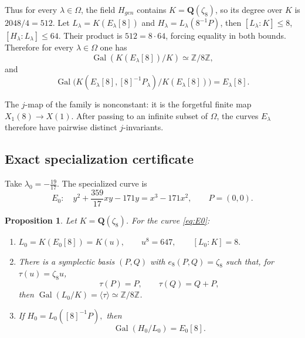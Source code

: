 \documentclass[11pt,a4paper]{amsart}
\newtheorem{proposition}[theorem]{Proposition}
\theoremstyle{definition}
\newcommand{\Q}{\mathbf Q}
\newcommand{\Gal}{\operatorname{Gal}}
\numberwithin{equation}{section}
\begin{document}
Thus  for every $\lambda\in\Omega$, the  field $H_{gen}$ contains $K=\Q(\zeta_8)$, so its degree over
$K$ is $2048/4=512$.  Let $L_\lambda=K(E_\lambda[8])$ and $H_\lambda=L_\lambda(8^{-1}P)$, then 
$
[L_\lambda:K]\le 8$,
$
[H_\lambda:L_\lambda]\le64.
$
Their product is $512=8\cdot64$, forcing equality in both bounds.  Therefore
for every $\lambda\in\Omega$ one has
\begin{equation*}\label{eq:full-specialized}
	\Gal(K(E_\lambda[8])/K)\simeq\mathbb{Z}/8\mathbb{Z},
\end{equation*}
and
\begin{equation*}\label{eq:full-translation}
	\Gal\bigl(K(E_\lambda[8],[8]^{-1}P_\lambda)/K(E_\lambda[8])\bigr)
	=E_\lambda[8].
\end{equation*}

The $j$-map of the family is nonconstant: it is the forgetful finite map
$X_1(8)\to X(1)$. After passing to an infinite subset of $\Omega$, the curves
$E_\lambda$ therefore have pairwise distinct $j$-invariants.






\subsection{Exact specialization certificate}\label{sec:certificate}

Take $\lambda_0=-\frac{19}{17}$. The specialized curve is
\begin{equation}\label{eq:E0}
 E_0:\quad
 y^2+\frac{359}{17}xy-171y=x^3-171x^2,
 \qquad P=(0,0).
\end{equation}

\begin{proposition}\label{prop:certificate}
Let $K=\Q(\zeta_8)$.  For the curve \eqref{eq:E0}:
\begin{enumerate}[label=\textup{(\roman*)}]
\item
$
 L_0=K(E_0[8])=K(u),\qquad u^8=647,
 \qquad [L_0:K]=8.
$
\item \label{basis}There is a symplectic basis $(P,Q)$ with $e_8(P,Q)=\zeta_8$ such
that, for $\tau(u)=\zeta_8u$,
\[
 \tau(P)=P,\qquad \tau(Q)=Q+P,
\]
then $\Gal(L_0/K)=\langle \tau \rangle\simeq \mathbb{Z}/8\mathbb{Z}$.
\item If
$
 H_0=L_0([8]^{-1}P),
$
then\[
 \Gal(H_0/L_0)=E_0[8].
\]
\end{enumerate}
\end{proposition}
\end{document}
